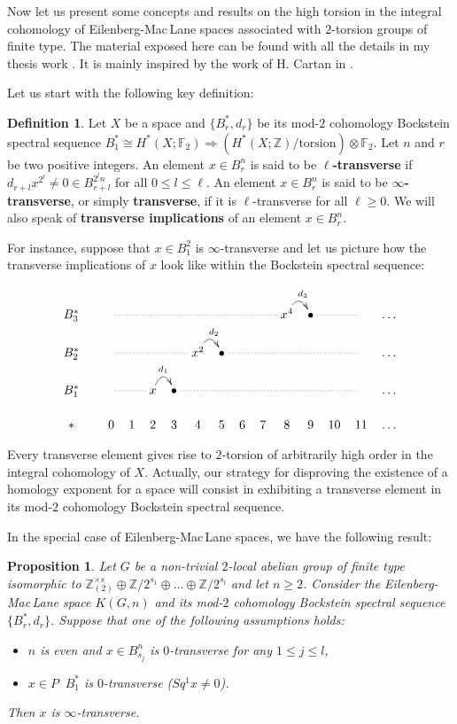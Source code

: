 \documentclass{conm-p-l}
\newtheorem{prop}[thm]{Proposition}
\theoremstyle{definition}
\newtheorem{defn}[thm]{Definition}
\DeclareMathOperator{\even}{^{even}}
\newcommand{\Z}{\mathbb{Z}}
\newcommand{\F}{\mathbb{F}}
\renewcommand{\geq}{\geqslant}
\renewcommand{\leq}{\leqslant}
\begin{document}
Now let us present some concepts and results on the high torsion in the integral cohomology of Eilenberg-Mac\,Lane spaces associated with $2$-torsion groups of finite type. The material exposed here can be found with all the details in my thesis work \cite{Cl02-PhD}. It is mainly inspired by the work of H. Cartan in \cite{Ca55}. 

\medskip
Let us start with the following key definition:

\begin{defn}
Let $X$ be a space and $\{B^*_r,d_r\}$ be its mod-$2$ cohomology Bockstein spectral sequence $B_1^*\cong H^*(X;\F_2)\Longrightarrow (H^*(X;\Z)/\text{torsion})\otimes\F_2$. Let $n$ and $r$ be two positive integers. An element $x\in B^n_r$ is said to be {\bf $\ell$-transverse} if $d_{r+l}x^{2^l}\not=0\in B^{2^l n}_{r+l}$ for all $0\leq l\leq\ell$. An element $x\in B^n_r$ is said to be \mbox{\bf $\infty$-transverse}, or simply {\bf transverse}, if it is $\ell$-transverse for all $\ell\geq0$. We will also speak of {\bf transverse implications} of an element $x\in B^n_r$.
\end{defn}

For instance, suppose that $x\in B_1^2$ is $\infty$-transverse and let us picture how the transverse implications of $x$ look like within the Bockstein spectral sequence:

$$\xymatrix@C=0.2cm@R=0.5truecm{
B_3^* &&\ar@{.}[rrrrrrrr] & & & & & & & &x^4\ar@/^0.4truecm/[r]^-{d_3} &\bullet\ar@{.}[rr] & &  &\dots\\
B_2^* &&\ar@{.}[rrrr] & & & &x^2\ar@/^0.4truecm/[r]^-{d_2} &\bullet\ar@{.}[rrrrrr] & & & & & &  &\dots\\
B_1^* &&\ar@{.}[rr] & &x\ar@/^0.4truecm/[r]^-{d_1} &\bullet\ar@{.}[rrrrrrrr] & & & & & & & & &\dots\\
{*}&&0 &1 &2 &3 &4 &5 &6 &7 &8 &9 &10 &11 &\dots
}$$

Every transverse element gives rise to $2$-torsion of arbitrarily high order in the integral cohomology of $X$. Actually, our strategy for disproving the existence of a homology exponent for a space will consist in exhibiting a transverse element in its mod-$2$ cohomology Bockstein spectral sequence. 

In the special case of Eilenberg-Mac\,Lane spaces, we have the following result:

\begin{prop}\label{p:transversity}
Let $G$ be a non-trivial $2$-local abelian group of finite type \mbox{isomorphic} to $\Z_{(2)}^{\times s}\oplus\Z/2^{s_1}\oplus\dots\oplus\Z/2^{s_l}$ and let $n\geq2$. Consider the Eilenberg-Mac\,Lane space $K(G,n)$ and its mod-$2$ cohomology Bockstein spectral sequence $\{B^*_r,d_r\}$. Suppose that one of the following assumptions holds:
\begin{itemize}
\item[$\bullet$]{$n$ is even and $x\in B^n_{s_j}$ is $0$-transverse for any $1\leq j\leq l$,}
\item[$\bullet$]{$x\in P\even B_1^*$ is $0$-transverse ($Sq^1x\not=0$).}
\end{itemize}
Then $x$ is $\infty$-transverse.
\end{prop}
\end{document}
